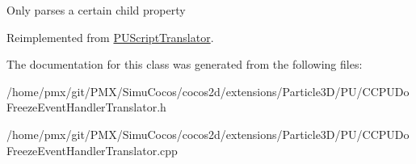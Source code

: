 Only parses a certain child property 

Reimplemented from \hyperlink{classPUScriptTranslator_a0374d83a8a04e57918975d525e0f8fe8}{P\+U\+Script\+Translator}.



The documentation for this class was generated from the following files\+:\begin{DoxyCompactItemize}
\item 
/home/pmx/git/\+P\+M\+X/\+Simu\+Cocos/cocos2d/extensions/\+Particle3\+D/\+P\+U/C\+C\+P\+U\+Do\+Freeze\+Event\+Handler\+Translator.\+h\item 
/home/pmx/git/\+P\+M\+X/\+Simu\+Cocos/cocos2d/extensions/\+Particle3\+D/\+P\+U/C\+C\+P\+U\+Do\+Freeze\+Event\+Handler\+Translator.\+cpp\end{DoxyCompactItemize}
